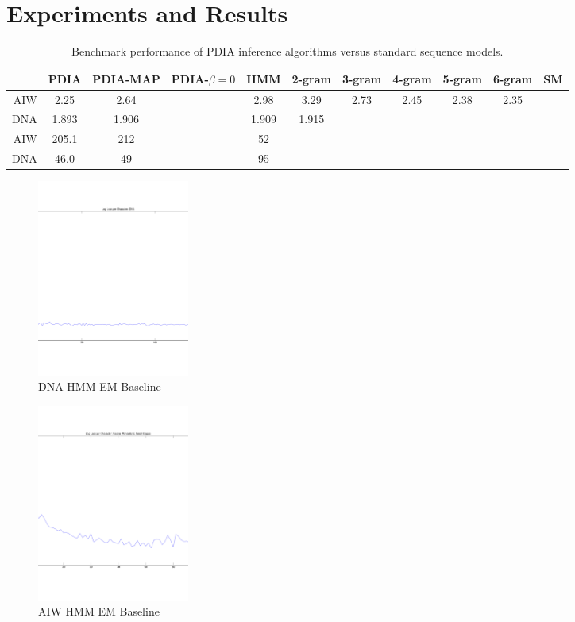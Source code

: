 \section{Experiments and Results}


\begin{table}[t]
    \begin{center}
    \setlength{\tabcolsep}{1.3mm}
\begin{tabular}{r|cccccccccc}
\hline
& {\bf PDIA } & PDIA-MAP & PDIA-$\beta=0$ & HMM & 2-gram& 3-gram & 4-gram & 5-gram & 6-gram & SM \\
\hline
AIW & 2.25 & 2.64 && 2.98 & 3.29 & 2.73 & 2.45 & 2.38 & 2.35 &\\
DNA & 1.893 & 1.906 & & 1.909 & 1.915 &&&&& \\
\hline
\hline
AIW & 205.1 & 212 &  & 52 &&&&&&\\
DNA & 46.0 & 49 &  & 95 &&&&&& \\
\hline
\end{tabular}
\end{center}
\caption[Short]{Benchmark performance of PDIA inference algorithms versus standard sequence models.}
\label{table:results}
\end{table}

\begin{figure}[htbp]
\begin{center}
\includegraphics[width=5cm]{results/dna_hmm_baseline}
\caption{DNA HMM EM Baseline}
\label{fig:dna_hmm_baseline}
\end{center}
\end{figure}


\begin{figure}[htbp]
\begin{center}
\includegraphics[width=5cm]{results/aiw_small_hmm_baseline}
\caption{AIW HMM EM Baseline}
\label{fig:aiw_hmm_baseline}
\end{center}
\end{figure}

